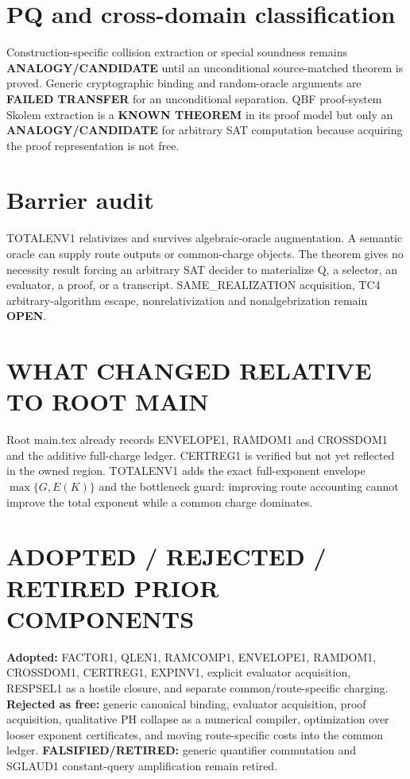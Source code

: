 \documentclass[11pt]{article}
\begin{document}
\section*{PQ and cross-domain classification}
Construction-specific collision extraction or special soundness remains \textbf{ANALOGY/CANDIDATE} until an unconditional source-matched theorem is proved. Generic cryptographic binding and random-oracle arguments are \textbf{FAILED TRANSFER} for an unconditional separation. QBF proof-system Skolem extraction is a \textbf{KNOWN THEOREM} in its proof model but only an \textbf{ANALOGY/CANDIDATE} for arbitrary SAT computation because acquiring the proof representation is not free.
\section*{Barrier audit}
TOTALENV1 relativizes and survives algebraic-oracle augmentation. A semantic oracle can supply route outputs or common-charge objects. The theorem gives no necessity result forcing an arbitrary SAT decider to materialize Q, a selector, an evaluator, a proof, or a transcript. SAME\_REALIZATION acquisition, TC4 arbitrary-algorithm escape, nonrelativization and nonalgebrization remain \textbf{OPEN}.
\section*{WHAT CHANGED RELATIVE TO ROOT MAIN}
Root main.tex already records ENVELOPE1, RAMDOM1 and CROSSDOM1 and the additive full-charge ledger. CERTREG1 is verified but not yet reflected in the owned region. TOTALENV1 adds the exact full-exponent envelope \(\max\{G,E(K)\}\) and the bottleneck guard: improving route accounting cannot improve the total exponent while a common charge dominates.
\section*{ADOPTED / REJECTED / RETIRED PRIOR COMPONENTS}
\textbf{Adopted:} FACTOR1, QLEN1, RAMCOMP1, ENVELOPE1, RAMDOM1, CROSSDOM1, CERTREG1, EXPINV1, explicit evaluator acquisition, RESPSEL1 as a hostile closure, and separate common/route-specific charging.
\textbf{Rejected as free:} generic canonical binding, evaluator acquisition, proof acquisition, qualitative PH collapse as a numerical compiler, optimization over looser exponent certificates, and moving route-specific costs into the common ledger.
\textbf{FALSIFIED/RETIRED:} generic quantifier commutation and SGLAUD1 constant-query amplification remain retired.
\end{document}
